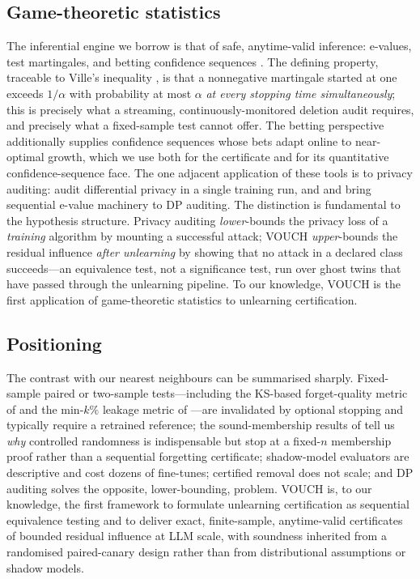 \subsection{Game-theoretic statistics}

The inferential engine we borrow is that of safe, anytime-valid inference: e-values,
test martingales, and betting confidence sequences
\citep{ramdas2023game,grunwald2024safe,shafer2021testing,waudbysmith2024,howard2021time}.
The defining property, traceable to Ville's inequality \citep{ville1939}, is that a
nonnegative martingale started at one exceeds $1/\alpha$ with probability at most
$\alpha$ \emph{at every stopping time simultaneously}; this is precisely what a
streaming, continuously-monitored deletion audit requires, and precisely what a
fixed-sample test cannot offer. The betting perspective
\citep{waudbysmith2024,orabona2016coin} additionally supplies confidence sequences
whose bets adapt online to near-optimal growth, which we use both for the certificate
and for its quantitative confidence-sequence face. The one adjacent application of
these tools is to privacy auditing: \citet{steinke2023privacy} audit differential
privacy in a single training run, and \citet{gonzalez2025sequential} and
\citet{csillag2026dpevalues} bring sequential e-value machinery to DP auditing. The
distinction is fundamental to the hypothesis structure. Privacy auditing
\emph{lower}-bounds the privacy loss of a \emph{training} algorithm by mounting a
successful attack; VOUCH \emph{upper}-bounds the residual influence \emph{after
unlearning} by showing that no attack in a declared class succeeds---an equivalence
test, not a significance test, run over ghost twins that have passed through the
unlearning pipeline. To our knowledge, VOUCH is the first application of
game-theoretic statistics to unlearning certification.

\subsection{Positioning}

The contrast with our nearest neighbours can be summarised sharply. Fixed-sample
paired or two-sample tests---including the KS-based forget-quality metric of
\citet{maini2024tofu} and the min-$k\%$ leakage metric of \citet{shi2024muse}---are
invalidated by optional stopping and typically require a retrained reference; the
sound-membership results of \citet{zhang2024mia} tell us \emph{why} controlled
randomness is indispensable but stop at a fixed-$n$ membership proof rather than a
sequential forgetting certificate; shadow-model evaluators \citep{hayes2024inexact}
are descriptive and cost dozens of fine-tunes; certified removal
\citep{guo2020certified,sekhari2021remember} does not scale; and DP auditing
\citep{steinke2023privacy,gonzalez2025sequential} solves the opposite,
lower-bounding, problem. VOUCH is, to our knowledge, the first framework to formulate
unlearning certification as sequential equivalence testing and to deliver exact,
finite-sample, anytime-valid certificates of bounded residual influence at LLM scale,
with soundness inherited from a randomised paired-canary design rather than from
distributional assumptions or shadow models.
